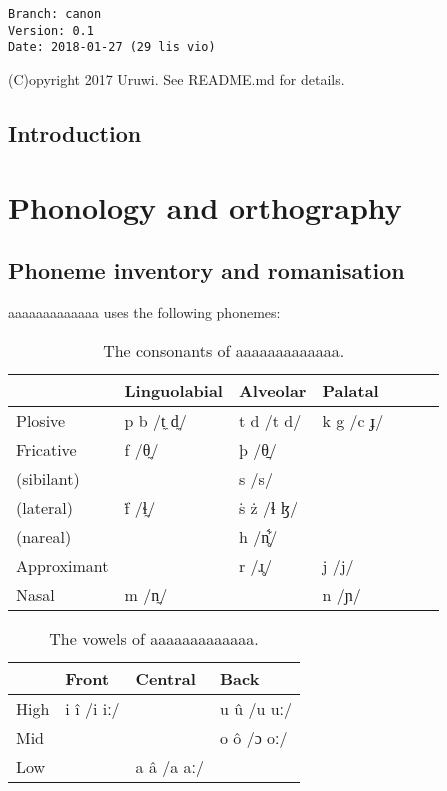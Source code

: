 \documentclass{book}
\newcommand{\lname}{aaaaaaaaaaaaa}
\begin{document}
\begin{verbatim}
Branch: canon
Version: 0.1
Date: 2018-01-27 (29 lis vio)
\end{verbatim}

(C)opyright 2017 Uruwi. See README.md for details.

\tableofcontents

\section{Introduction}

\chapter{Phonology and orthography}

\section{Phoneme inventory and romanisation}

\lname{} uses the following phonemes:

\begin{table}[h]
  \caption{The consonants of \lname{}.}
  \centering
  \begin{tabular}{l|llllll}
      & Linguolabial & Alveolar & Palatal \\
      \hline
      Plosive & p b /t̼ d̼/ & t d /t d/ & k g /c ɟ/ \\
      Fricative & f /θ̼/ & þ /θ̠/ & \\
      (sibilant) & & s /s/ & \\
      (lateral) & ḟ /ɬ̼/ & ṡ ż /ɬ ɮ/ & \\
      (nareal) & & h /n̥͋/ & \\
      Approximant & & r /ɹ̥/ & j /j/ \\
      Nasal & m /n̼/ & & n /ɲ/ \\
  \end{tabular}
\end{table}
\begin{table}[h]
\centering
  \caption{The vowels of \lname.}
  \begin{tabular}{l|lll}
    & Front & Central & Back \\
    \hline
    High & i î /i iː/ & & u û /u uː/ \\
    Mid & & & o ô /ɔ oː/ \\
    Low & & a â /a aː/ & \\
  \end{tabular}
\end{table}
\end{document}
